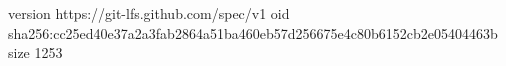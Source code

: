 version https://git-lfs.github.com/spec/v1
oid sha256:cc25ed40e37a2a3fab2864a51ba460eb57d256675e4c80b6152cb2e05404463b
size 1253
